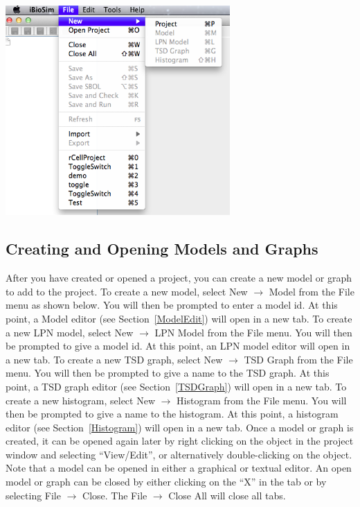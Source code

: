 \documentclass[titlepage,11pt]{article}
\begin{document}
\begin{center}
\includegraphics[height=80mm]{screenshots/project}
\end{center}

\clearpage

\subsection{Creating and Opening Models and Graphs}

\noindent
After you have created or opened a project, you can create a new model or graph to add to the project.  To create a new model, select New $\rightarrow$ Model from the File menu as shown below. You will then be prompted to enter a model id.  At this point, a Model editor (see Section~\ref{ModelEdit}) will open in a new tab.  To create a new LPN model, select New $\rightarrow$ LPN Model from the File menu. You will then be prompted to give a model id.  At this point, an LPN model editor 
will open in a new tab. To create a new TSD graph, select New $\rightarrow$ TSD Graph from the File menu. You will then be prompted to give a name to the TSD graph.  At this point, a TSD graph editor (see Section~\ref{TSDGraph}) will open in a new tab. To create a new histogram, select New $\rightarrow$ Histogram from the File menu. You will then be prompted to give a name to the histogram.  At this point, a histogram editor (see Section~\ref{Histogram}) will open in a new tab.  Once a model or graph is created, it can be opened again later by right clicking on the object in the project window and selecting ``View/Edit'', or alternatively double-clicking on the object.  Note that a model can be opened in either a graphical or textual editor.  An open model or graph can be closed by either clicking on the ``X'' in the tab or by selecting File $\rightarrow$ Close.  The File $\rightarrow$ Close All will close all tabs.
\end{document}
